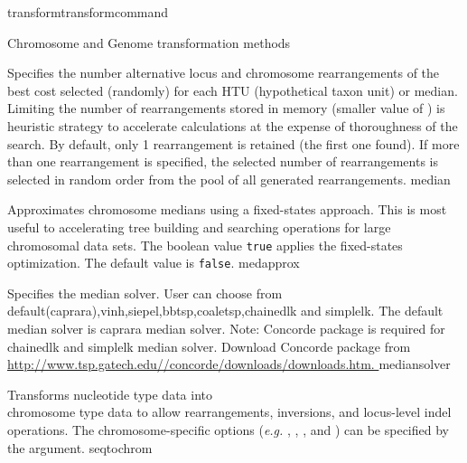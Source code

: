 \begin{command}{transform}{transformcommand}
\begin{arguments}
\begin{argumentgroup}{Chromosome and Genome transformation methods}
\begin{description}
                    {Specifies the number alternative locus and chromosome
                    rearrangements of the best cost selected (randomly) for
                    each HTU (hypothetical taxon unit) or median. Limiting the number of rearrangements
                    stored in memory (smaller value of )
                    is heuristic strategy to accelerate calculations at the
                    expense of thoroughness of the search. By default, only 1
                    rearrangement is retained (the first one found). If more than
                    one rearrangement is specified, the selected number of
                    rearrangements is selected in random order from the pool of
                    all generated rearrangements.}
                    {median}

                    {Approximates chromosome medians using a fixed-states
                    approach. This is most useful to accelerating tree
                    building and searching operations for large chromosomal
                    data sets. The boolean value \texttt{true} applies the
                    fixed-states optimization. The default value is
                    \texttt{false}.}
                    {medapprox}
                        
                   {Specifies the median solver. User can choose from
                   default(caprara),vinh,siepel,bbtsp,coaletsp,chainedlk and simplelk. The
                   default median solver is caprara median solver. Note:
                   Concorde package is required for chainedlk and simplelk
                   median solver. Download Concorde package from \\
                  \url{http://www.tsp.gatech.edu//concorde/downloads/downloads.htm. } }
                   {mediansolver}
                       
                                           
          	 {Transforms nucleotide type data into \\ chromosome type data to allow
           	 rearrangements, inversions, and locus-level indel operations.  The
            	chromosome-specific options (\emph{e.g.}  , 
            	, , and 
		) can be specified by the argument.}
                	     {seqtochrom}
           

\end{description}
\end{argumentgroup}
\end{arguments}
\end{command}

